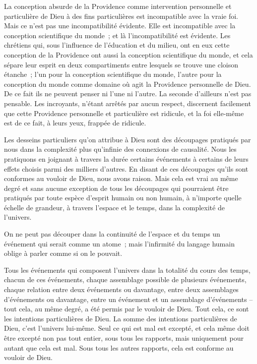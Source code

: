 \documentclass[french,twoside]{book} %
\begin{document}
La conception absurde de la Providence comme intervention personnelle et particulière de Dieu à des fins particulières est incompatible avec la vraie foi. Mais ce n'est pas une incompatibilité évidente. Elle est incompatible avec la conception scientifique du monde ; et là l'incompatibilité est évidente. Les chrétiens qui, sous l'influence de l'éducation et du milieu, ont en eux cette conception de la Providence ont aussi la conception scientifique du monde, et cela sépare leur esprit en deux compartiments entre lesquels se trouve une cloison étanche ; l'un pour la conception scientifique du monde, l'autre pour la conception du monde comme domaine où agit la Providence personnelle de Dieu. De ce fait ils ne peuvent penser ni l'une ni l'autre. La seconde d'ailleurs n'est pas pensable. Les incroyants, n'étant arrêtés par aucun respect, discernent facilement que cette Providence personnelle et particulière est ridicule, et la foi elle-même est de ce fait, à leurs yeux, frappée de ridicule.\par
Les desseins particuliers qu'on attribue à Dieu sont des découpages pratiqués par nous dans la complexité plus qu'infinie des connexions de causalité. Nous les pratiquons en joignant à travers la durée certains événements à certains de leurs effets choisis parmi des milliers d'autres. En disant de ces découpages qu'ils sont conformes au vouloir de Dieu, nous avons raison. Mais cela est vrai au même degré et sans aucune exception de tous les découpages qui pourraient être pratiqués par toute espèce d'esprit humain ou non humain, à n'importe quelle échelle de grandeur, à travers l'espace et le temps, dans la complexité de l'univers.\par
On ne peut pas découper dans la continuité de l'espace et du temps un événement qui serait comme un atome ; mais l'infirmité du langage humain oblige à parler comme si on le pouvait.\par
Tous les événements qui composent l'univers dans la totalité du cours des temps, chacun de ces événements, chaque assemblage possible de plusieurs événements, chaque relation entre deux événements ou davantage, entre deux assemblages d'événements ou davantage, entre un événement et un assemblage d'événements – tout cela, au même degré, a été permis par le vouloir de Dieu. Tout cela, ce sont les intentions particulières de Dieu. La somme des intentions particulières de Dieu, c'est l'univers lui-même. Seul ce qui est mal est excepté, et cela même doit être excepté non pas tout entier, sous tous les rapports, mais uniquement pour autant que cela est mal. Sous tous les autres rapports, cela est conforme au vouloir de Dieu.\par
\end{document}
